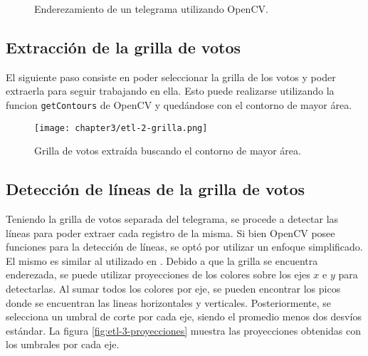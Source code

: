 \begin{figure}[H]
    \centering



    \caption{Enderezamiento de un telegrama utilizando OpenCV.}
    \label{fig:etl-1-rotacion}
\end{figure}

\subsection{Extracci\'on de la grilla de votos}
El siguiente paso consiste en poder seleccionar la grilla de los votos y poder extraerla para seguir trabajando en
ella. Esto puede realizarse utilizando la funcion \verb|getContours| de OpenCV y qued\'andose con el contorno de mayor
\'area.

\begin{figure}[H]
    \centering
    \texttt{[image: chapter3/etl-2-grilla.png]}
    \caption{Grilla de votos extra\'ida buscando el contorno de mayor \'area.}
    \label{fig:etl-2-grilla}
\end{figure}

\subsection{Detecci\'on de l\'ineas de la grilla de votos}
Teniendo la grilla de votos separada del telegrama, se procede a detectar las l\'ineas para poder extraer cada registro
de la misma. Si bien OpenCV posee funciones para la detecci\'on de l\'ineas, se opt\'o por utilizar un enfoque
simplificado. El mismo es similar al utilizado en \parencite{lamagna2016lectura}. Debido a que la grilla se encuentra enderezada, se puede utilizar proyecciones de los
colores sobre los ejes $x$ e $y$ para detectarlas. Al sumar todos los colores por eje, se pueden encontrar los picos
donde se encuentran las lineas horizontales y verticales. Posteriormente, se selecciona un umbral de corte por cada
eje, siendo el promedio menos dos desv\'ios est\'andar. La figura \ref{fig:etl-3-proyecciones} muestra las proyecciones
obtenidas con los umbrales por cada eje.

